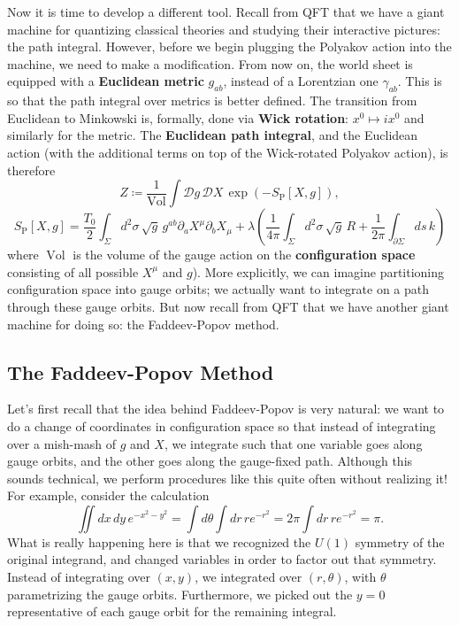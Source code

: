 \documentclass{report}
\theoremstyle{plain}
\theoremstyle{definition}
\theoremstyle{remark}
\newcommand{\di}{\partial}
\newcommand{\cD}{\mathcal{D}}
\DeclareMathOperator{\Vol}{Vol}
\begin{document}
Now it is time to develop a different tool. Recall from QFT that we
have a giant machine for quantizing classical theories and studying
their interactive pictures: the path integral. However, before we
begin plugging the Polyakov action into the machine, we need to make a
modification. From now on, the world sheet is equipped with a {\bf
  Euclidean metric} $g_{ab}$, instead of a Lorentzian one
$\gamma_{ab}$. This is so that the path integral over metrics is
better defined. The transition from Euclidean to Minkowski is,
formally, done via {\bf Wick rotation}: $x^0 \mapsto ix^0$ and
similarly for the metric. The {\bf Euclidean path integral}, and the
Euclidean action (with the additional terms on top of the Wick-rotated
Polyakov action), is therefore
\[ Z \coloneqq \frac{1}{\Vol} \int \cD g \, \cD X \, \exp(-S_{\text{P}}[X, g]), \]
\[ S_{\text{P}}[X, g] = \frac{T_0}{2} \int_\Sigma d^2\sigma \, \sqrt{g} \, g^{ab} \di_a X^\mu \di_b X_\mu + \lambda\left(\frac{1}{4\pi} \int_\Sigma d^2\sigma \, \sqrt{g} \, R + \frac{1}{2\pi}\int_{\di \Sigma} ds \, k\right) \]
where $\Vol$ is the volume of the gauge action on the {\bf
  configuration space} consisting of all possible $X^\mu$ and
$g$). More explicitly, we can imagine partitioning configuration
space into gauge orbits; we actually want to integrate on a path
through these gauge orbits. But now recall from QFT that we have
another giant machine for doing so: the Faddeev-Popov method.

\subsection{The Faddeev-Popov Method}

Let's first recall that the idea behind Faddeev-Popov is very natural:
we want to do a change of coordinates in configuration space so that
instead of integrating over a mish-mash of $g$ and $X$, we integrate
such that one variable goes along gauge orbits, and the other goes
along the gauge-fixed path. Although this sounds technical, we perform
procedures like this quite often without realizing it! For example,
consider the calculation
\[ \iint dx \, dy \, e^{-x^2 - y^2} = \int d\theta \int dr \, r e^{-r^2} = 2\pi \int dr \, r e^{-r^2} = \pi. \]
What is really happening here is that we recognized the $U(1)$
symmetry of the original integrand, and changed variables in order to
factor out that symmetry. Instead of integrating over $(x, y)$, we
integrated over $(r, \theta)$, with $\theta$ parametrizing the gauge
orbits. Furthermore, we picked out the $y = 0$ representative of
each gauge orbit for the remaining integral.
\end{document}
